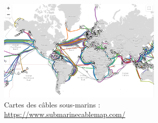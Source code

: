 \documentclass[
  11pt,
]{article}
\begin{document}
\begin{figure}
\centering
\includegraphics[width=0.7\textwidth,height=\textheight]{images/cable-sousmarin.png}
\caption{Cartes des câbles sous-marins :
\url{https://www.submarinecablemap.com/}}
\end{figure}
\end{document}

